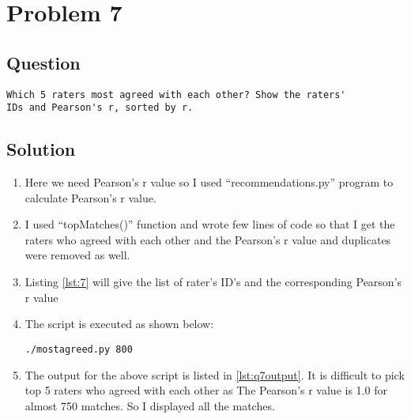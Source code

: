 \section{Problem 7}
\label{part7}
\subsection*{Question}
\begingroup
\begin{verbatim}
Which 5 raters most agreed with each other? Show the raters'
IDs and Pearson's r, sorted by r.
\end{verbatim}
\subsection{Solution}
\begin{enumerate}
\item Here we need Pearson's r value so I used ``recommendations.py'' program to calculate Pearson's r value.
\item I used ``topMatches()'' function and wrote few lines of code so that I get the raters who agreed with each other and the Pearson's r value and duplicates were removed as well.
\item Listing \ref{lst:7} will give the list of rater's ID's and the corresponding Pearson's r value
\item The script is executed as shown below:
\begin{lstlisting}[frame=single]
./mostagreed.py 800
\end{lstlisting}
\item The output for the above script is listed in \ref{lst:q7output}. It is difficult to pick top 5 raters who agreed with each other as The Pearson's r value is 1.0 for almost 750 matches. So I displayed all the matches.

\end{enumerate}


\newpage

\newpage